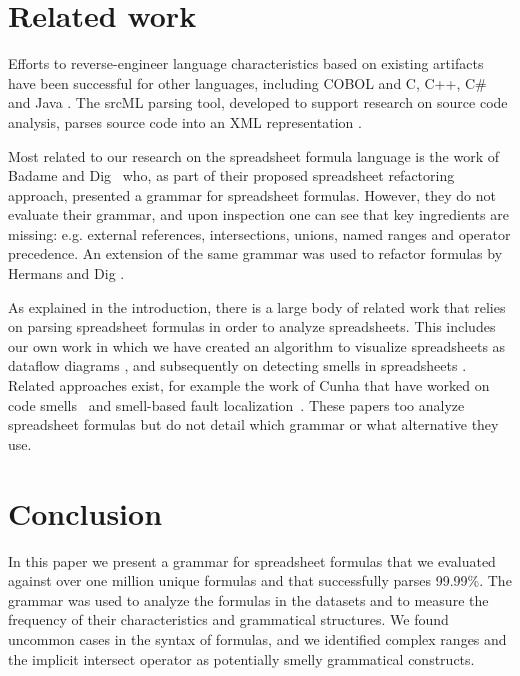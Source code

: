 \documentclass[conference]{IEEEtran}
\begin{document}
\section{Related work}
\label{section:relatedWork}
Efforts to reverse-engineer language characteristics based on existing artifacts have been successful for other languages, including COBOL \cite{van1997obtaining} and C, C++, C\# and Java \cite{zaytsev2010recovery}. The srcML parsing tool, developed to support research on source code analysis, parses source code into an XML representation \cite{srcML}.

Most related to our research on the spreadsheet formula language is the work of Badame and Dig~\cite{badame2012refactoring} who, as part of their proposed spreadsheet refactoring approach, presented a grammar for spreadsheet formulas. However, they do not evaluate their grammar, and upon inspection one can see that key ingredients are missing: e.g. external references, intersections, unions, named ranges and operator precedence. An extension of the same grammar was used to refactor formulas by Hermans and Dig \cite{hermans2014bumblebee}.

As explained in the introduction, there is a large body of related work that relies on parsing spreadsheet formulas in order to analyze spreadsheets. This includes our own work in which we have created an algorithm to visualize spreadsheets as dataflow diagrams \cite{DBLP:conf/icse/HermansPD11}, and subsequently on detecting smells in spreadsheets \cite{DBLP:conf/icse/HermansPD12,DBLP:conf/icsm/Hermans212}. Related approaches exist, for example the work of Cunha that have worked on code smells~\cite{iccsa12} and smell-based fault localization~\cite{conf/icsme/CunhaFMPS14}. These papers too analyze spreadsheet formulas but do not detail which grammar or what alternative they use.

\section{Conclusion}
\label{section:conclusion}
In this paper we present a grammar for spreadsheet formulas that we evaluated against over one million unique formulas and that successfully parses 99.99\%. The grammar was used to analyze the formulas in the datasets and to measure the frequency of their characteristics and grammatical structures. We found uncommon cases in the syntax of formulas, and we identified complex ranges and the implicit intersect operator as potentially smelly grammatical constructs.
\end{document}
